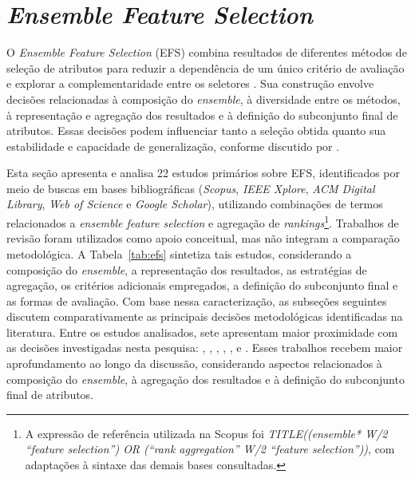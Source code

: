 \section{\textit{Ensemble Feature Selection}}\label{ensambleFS}

O \textit{Ensemble Feature Selection} (EFS) combina resultados de diferentes métodos de seleção de atributos para reduzir a dependência de um único critério de avaliação e explorar a complementaridade entre os seletores . Sua construção envolve decisões relacionadas à composição do \textit{ensemble}, à diversidade entre os métodos, à representação e agregação dos resultados e à definição do subconjunto final de atributos. Essas decisões podem influenciar tanto a seleção obtida quanto sua estabilidade e capacidade de generalização, conforme discutido por .

Esta seção apresenta e analisa 22 estudos primários sobre EFS, identificados por meio de buscas em bases bibliográficas (\textit{Scopus}, \textit{IEEE Xplore}, \textit{ACM Digital Library}, \textit{Web of Science} e \textit{Google Scholar}), utilizando combinações de termos relacionados a \textit{ensemble feature selection} e agregação de \textit{rankings}\footnote{A expressão de referência utilizada na Scopus foi \textit{TITLE((ensemble* W/2 ``feature selection'') OR (``rank aggregation'' W/2 ``feature selection''))}, com adaptações à sintaxe das demais bases consultadas.}. Trabalhos de revisão foram utilizados como apoio conceitual, mas não integram a comparação metodológica. A Tabela~\ref{tab:efs} sintetiza tais estudos, considerando a composição do \textit{ensemble}, a representação dos resultados, as estratégias de agregação, os critérios adicionais empregados, a definição do subconjunto final e as formas de avaliação. Com base nessa caracterização, as subseções seguintes discutem comparativamente as principais decisões metodológicas identificadas na literatura. Entre os estudos analisados, sete apresentam maior proximidade com as decisões investigadas nesta pesquisa: , , , , ,  e . Esses trabalhos recebem maior aprofundamento ao longo da discussão, considerando aspectos relacionados à composição do \textit{ensemble}, à agregação dos resultados e à definição do subconjunto final de atributos.

